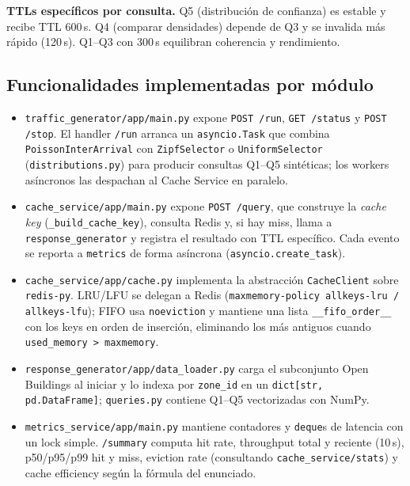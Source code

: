 \documentclass[11pt,a4paper]{article}
\begin{document}
\textbf{TTLs específicos por consulta.} Q5 (distribución de confianza) es
estable y recibe TTL 600\,s. Q4 (comparar densidades) depende de Q3 y se
invalida más rápido (120\,s). Q1--Q3 con 300\,s equilibran coherencia y
rendimiento.

\subsection{Funcionalidades implementadas por módulo}

\begin{itemize}[leftmargin=*]
\item \texttt{traffic\_generator/app/main.py} expone \texttt{POST /run},
  \texttt{GET /status} y \texttt{POST /stop}. El handler \texttt{/run}
  arranca un \texttt{asyncio.Task} que combina \texttt{PoissonInterArrival}
  con \texttt{ZipfSelector} o \texttt{UniformSelector}
  (\texttt{distributions.py}) para producir consultas Q1--Q5 sintéticas;
  los workers asíncronos las despachan al Cache Service en paralelo.
\item \texttt{cache\_service/app/main.py} expone \texttt{POST /query}, que
  construye la \textit{cache key} (\texttt{\_build\_cache\_key}), consulta
  Redis y, si hay miss, llama a \texttt{response\_generator} y registra
  el resultado con TTL específico. Cada evento se reporta a
  \texttt{metrics} de forma asíncrona (\texttt{asyncio.create\_task}).
\item \texttt{cache\_service/app/cache.py} implementa la abstracción
  \texttt{CacheClient} sobre \texttt{redis-py}. LRU/LFU se delegan a
  Redis (\texttt{maxmemory-policy allkeys-lru / allkeys-lfu}); FIFO usa
  \texttt{noeviction} y mantiene una lista \texttt{\_\_fifo\_order\_\_}
  con los keys en orden de inserción, eliminando los más antiguos cuando
  \texttt{used\_memory > maxmemory}.
\item \texttt{response\_generator/app/data\_loader.py} carga el subconjunto
  Open Buildings al iniciar y lo indexa por \texttt{zone\_id} en un
  \texttt{dict[str, pd.DataFrame]}; \texttt{queries.py} contiene Q1--Q5
  vectorizadas con NumPy.
\item \texttt{metrics\_service/app/main.py} mantiene contadores y
  \texttt{deque}s de latencia con un lock simple. \texttt{/summary}
  computa hit rate, throughput total y reciente (10\,s), p50/p95/p99 hit y
  miss, eviction rate (consultando \texttt{cache\_service/stats}) y cache
  efficiency según la fórmula del enunciado.
\end{itemize}
\end{document}
